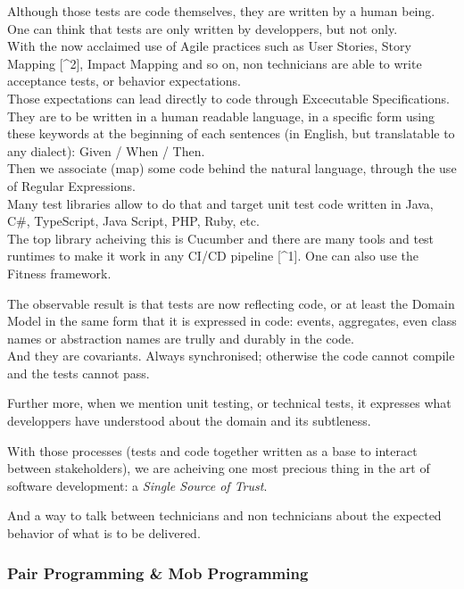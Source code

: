 Although those tests are code themselves, they are written by a human
being.\\One can think that tests are only written by developpers, but
not only.\\With the now acclaimed use of Agile practices such as User
Stories, Story Mapping {[}\^{}2{]}, Impact Mapping and so on, non
technicians are able to write acceptance tests, or behavior
expectations.\\Those expectations can lead directly to code through
Excecutable Specifications.\\They are to be written in a human readable
language, in a specific form using these keywords at the beginning of
each sentences (in English, but translatable to any dialect): Given /
When / Then.\\Then we associate (map) some code behind the natural
language, through the use of Regular Expressions.\\Many test libraries
allow to do that and target unit test code written in Java, C\#,
TypeScript, Java Script, PHP, Ruby, etc.\\The top library acheiving this
is Cucumber and there are many tools and test runtimes to make it work
in any CI/CD pipeline {[}\^{}1{]}. One can also use the Fitness
framework.

The observable result is that tests are now reflecting code, or at least
the Domain Model in the same form that it is expressed in code: events,
aggregates, even class names or abstraction names are trully and durably
in the code.\\And they are covariants. Always synchronised; otherwise
the code cannot compile and the tests cannot pass.

Further more, when we mention unit testing, or technical tests, it
expresses what developpers have understood about the domain and its
subtleness.

With those processes (tests and code together written as a base to
interact between stakeholders), we are acheiving one most precious thing
in the art of software development: a \emph{Single Source of Trust}.

And a way to talk between technicians and non technicians about the
expected behavior of what is to be delivered.

\subsubsection{Pair Programming \& Mob
Programming}\label{pair-programming-mob-programming}

